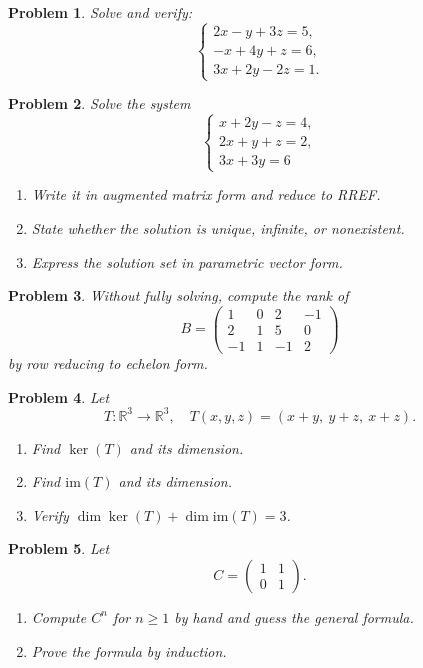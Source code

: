 \documentclass[11pt]{article}
\theoremstyle{upright}
\newtheorem{problem}{Problem}
\begin{document}
\begin{problem}
Solve and verify:
\[
\begin{cases}
2x-y+3z=5,\\
-x+4y+z=6,\\
3x+2y-2z=1.
\end{cases}
\]
\end{problem}
\begin{problem}
Solve the system
\[
\begin{cases}
x + 2y - z = 4, \\
2x + y + z = 2, \\
3x + 3y = 6
\end{cases}
\]
\begin{enumerate}
    \item Write it in augmented matrix form and reduce to RREF.
    \item State whether the solution is unique, infinite, or nonexistent.
    \item Express the solution set in parametric vector form.
\end{enumerate}
\end{problem}
\begin{problem}
Without fully solving, compute the rank of
\[
B =
\begin{pmatrix}
1 & 0 & 2 & -1 \\
2 & 1 & 5 & 0 \\
-1 & 1 & -1 & 2
\end{pmatrix}
\]
by row reducing to echelon form.
\end{problem}

\begin{problem}
Let
\[
T: \mathbb{R}^3 \to \mathbb{R}^3, \quad
T(x,y,z) = (x + y, \ y + z, \ x + z).
\]
\begin{enumerate}
    \item Find $\ker(T)$ and its dimension.
    \item Find $\mathrm{im}(T)$ and its dimension.
    \item Verify $\dim \ker(T) + \dim \mathrm{im}(T) = 3$.
\end{enumerate}
\end{problem}

\begin{problem}
Let
\[
C =
\begin{pmatrix}
1 & 1 \\
0 & 1
\end{pmatrix}.
\]
\begin{enumerate}
    \item Compute $C^n$ for $n \geq 1$ by hand and guess the general formula.
    \item Prove the formula by induction.
\end{enumerate}
\end{problem}
\end{document}
